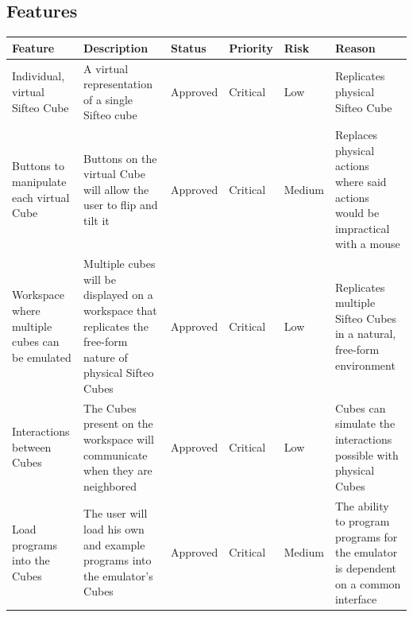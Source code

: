 \documentclass[12pt]{article}
\begin{document}
\appendix
    \begin{landscape}
    \section{Features}
    \begin{table}[h!]
      \begin{tabular}{p{1.5in} | p{2.25in} | p{.75in} | p{.75in} | p{.75in} | p{2.25in}}
        \textbf{Feature} &
        \textbf{Description} &
        \textbf{Status} &
        \textbf{Priority} &
        \textbf{Risk} &
        \textbf{Reason} \\ \hline

        Individual, virtual Sifteo Cube &
        A virtual representation of a single Sifteo cube &
        Approved &
        Critical &
        Low &
        Replicates physical Sifteo Cube \\ \hline

        Buttons to manipulate each virtual Cube &
        Buttons on the virtual Cube will allow the user to flip and tilt it &
        Approved &
        Critical &
        Medium &
        Replaces physical actions where said actions would be impractical with a mouse \\ \hline

        Workspace where multiple cubes can be emulated &
        Multiple cubes will be displayed on a workspace that replicates the free-form nature of physical Sifteo Cubes\index{Sifteo Cubes} &
        Approved &
        Critical &
        Low &
        Replicates multiple Sifteo Cubes\index{Sifteo Cubes} in a natural, free-form environment \\ \hline

        Interactions between Cubes &
        The Cubes present on the workspace will communicate when they are neighbored &
        Approved &
        Critical &
        Low &
        Cubes can simulate the interactions possible with physical Cubes \\ \hline

        Load programs into the Cubes &
        The user will load his own and example programs into the emulator’s\index{emulator} Cubes &
        Approved &
        Critical &
        Medium &
        The ability to program programs for the emulator\index{emulator} is dependent on a common interface \\ \hline


\end{tabular}
\end{table}
\end{landscape}
\end{document}
